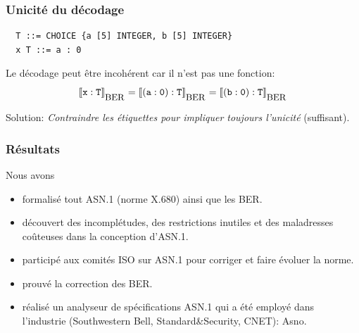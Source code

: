 \documentclass[compress,dvips,xcolor={dvipsnames},t]{beamer}
\begin{document}
\begin{frame}[fragile]
\frametitle{Unicité du décodage}

\begin{verbatim}
  T ::= CHOICE {a [5] INTEGER, b [5] INTEGER}
  x T ::= a : 0
\end{verbatim}

\noindent Le décodage peut être incohérent car il n'est pas une fonction:
$$\llbracket \verb+x+ : \verb+T+\rrbracket_{_{\textrm{\small BER}}} =
\llbracket(\verb+a+ : \verb+0+) : \verb+T+\rrbracket_{_{\textrm{\small BER}}} =
 \llbracket(\verb+b+ : \verb+0+) : \verb+T+\rrbracket_{_{\textrm{\small BER}}}$$

\noindent Solution: {\em Contraindre les étiquettes pour impliquer
toujours l'unicité} (suffisant).

\end{frame}


\begin{frame}
\frametitle{Résultats}

\noindent Nous avons

\begin{itemize}
  \item formalisé tout ASN.1 (norme X.680) ainsi que les BER.

  \item découvert des incomplétudes, des restrictions inutiles et des
        maladresses coûteuses dans la conception d'ASN.1.

  \item participé aux comités ISO sur ASN.1 pour corriger et faire
        évoluer la norme.

  \item prouvé la correction des BER.

  \item réalisé un analyseur de spécifications ASN.1 qui a été employé
        dans l'industrie (Southwestern Bell, Standard\&Security, CNET):
        \textsf{Asno}.
\end{itemize}
\end{frame}
\end{document}
